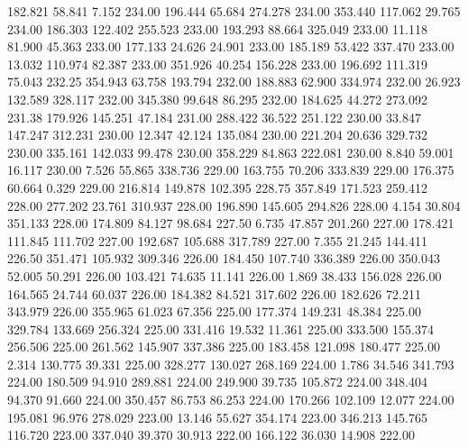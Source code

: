  182.821   58.841    7.152       234.00
 196.444   65.684  274.278       234.00
 353.440  117.062   29.765       234.00
 186.303  122.402  255.523       233.00
 193.293   88.664  325.049       233.00
  11.118   81.900   45.363       233.00
 177.133   24.626   24.901       233.00
 185.189   53.422  337.470       233.00
  13.032  110.974   82.387       233.00
 351.926   40.254  156.228       233.00
 196.692  111.319   75.043       232.25
 354.943   63.758  193.794       232.00
 188.883   62.900  334.974       232.00
  26.923  132.589  328.117       232.00
 345.380   99.648   86.295       232.00
 184.625   44.272  273.092       231.38
 179.926  145.251   47.184       231.00
 288.422   36.522  251.122       230.00
  33.847  147.247  312.231       230.00
  12.347   42.124  135.084       230.00
 221.204   20.636  329.732       230.00
 335.161  142.033   99.478       230.00
 358.229   84.863  222.081       230.00
   8.840   59.001   16.117       230.00
   7.526   55.865  338.736       229.00
 163.755   70.206  333.839       229.00
 176.375   60.664    0.329       229.00
 216.814  149.878  102.395       228.75
 357.849  171.523  259.412       228.00
 277.202   23.761  310.937       228.00
 196.890  145.605  294.826       228.00
   4.154   30.804  351.133       228.00
 174.809   84.127   98.684       227.50
   6.735   47.857  201.260       227.00
 178.421  111.845  111.702       227.00
 192.687  105.688  317.789       227.00
   7.355   21.245  144.411       226.50
 351.471  105.932  309.346       226.00
 184.450  107.740  336.389       226.00
 350.043   52.005   50.291       226.00
 103.421   74.635   11.141       226.00
   1.869   38.433  156.028       226.00
 164.565   24.744   60.037       226.00
 184.382   84.521  317.602       226.00
 182.626   72.211  343.979       226.00
 355.965   61.023   67.356       225.00
 177.374  149.231   48.384       225.00
 329.784  133.669  256.324       225.00
 331.416   19.532   11.361       225.00
 333.500  155.374  256.506       225.00
 261.562  145.907  337.386       225.00
 183.458  121.098  180.477       225.00
   2.314  130.775   39.331       225.00
 328.277  130.027  268.169       224.00
   1.786   34.546  341.793       224.00
 180.509   94.910  289.881       224.00
 249.900   39.735  105.872       224.00
 348.404   94.370   91.660       224.00
 350.457   86.753   86.253       224.00
 170.266  102.109   12.077       224.00
 195.081   96.976  278.029       223.00
  13.146   55.627  354.174       223.00
 346.213  145.765  116.720       223.00
 337.040   39.370   30.913       222.00
 166.122   36.030   14.908       222.00

